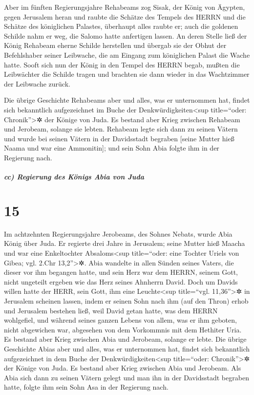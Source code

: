 Aber im fünften Regierungsjahre Rehabeams zog Sisak, der
König von Ägypten, gegen Jerusalem heran und raubte die
Schätze des Tempels des HERRN und die Schätze des königlichen Palastes,
überhaupt alles raubte er; auch die goldenen Schilde nahm er weg, die
Salomo hatte anfertigen lassen. An deren Stelle ließ der
König Rehabeam eherne Schilde herstellen und übergab sie der Obhut der
Befehlshaber seiner Leibwache, die am Eingang zum königlichen Palast die
Wache hatte. Sooft sich nun der König in den Tempel des
HERRN begab, mußten die Leibwächter die Schilde tragen und brachten sie
dann wieder in das Wachtzimmer der Leibwache zurück.

Die übrige Geschichte Rehabeams aber und alles, was er
unternommen hat, findet sich bekanntlich aufgezeichnet im Buche der
Denkwürdigkeiten\textless sup title=``oder: Chronik''\textgreater✲ der
Könige von Juda. Es bestand aber Krieg zwischen Rehabeam
und Jerobeam, solange sie lebten. Rehabeam legte sich
dann zu seinen Vätern und wurde bei seinen Vätern in der Davidsstadt
begraben {[}seine Mutter hieß Naama und war eine Ammonitin{]}; und sein
Sohn Abia folgte ihm in der Regierung nach.

\hypertarget{cc-regierung-des-kuxf6nigs-abia-von-juda}{%
\subparagraph{cc) Regierung des Königs Abia von
Juda}\label{cc-regierung-des-kuxf6nigs-abia-von-juda}}

\hypertarget{section-14}{%
\section{15}\label{section-14}}

Im achtzehnten Regierungsjahre Jerobeams, des Sohnes
Nebats, wurde Abia König über Juda. Er regierte drei Jahre
in Jerusalem; seine Mutter hieß Maacha und war eine Enkeltochter
Absaloms\textless sup title=``oder: eine Tochter Uriels von Gibea; vgl.
2.Chr 13,2''\textgreater✲. Abia wandelte in allen Sünden
seines Vaters, die dieser vor ihm begangen hatte, und sein Herz war dem
HERRN, seinem Gott, nicht ungeteilt ergeben wie das Herz seines Ahnherrn
David. Doch um Davids willen hatte der HERR, sein Gott,
ihm eine Leuchte\textless sup title=``vgl. 11,36''\textgreater✲ in
Jerusalem scheinen lassen, indem er seinen Sohn nach ihm (auf den Thron)
erhob und Jerusalem bestehen ließ, weil David getan hatte,
was dem HERRN wohlgefiel, und während seines ganzen Lebens von allem,
was er ihm geboten, nicht abgewichen war, abgesehen von dem Vorkommnis
mit dem Hethiter Uria. Es bestand aber Krieg zwischen Abia
und Jerobeam, solange er lebte. Die übrige Geschichte
Abias aber und alles, was er unternommen hat, findet sich bekanntlich
aufgezeichnet in dem Buche der Denkwürdigkeiten\textless sup
title=``oder: Chronik''\textgreater✲ der Könige von Juda. Es bestand
aber Krieg zwischen Abia und Jerobeam. Als Abia sich dann
zu seinen Vätern gelegt und man ihn in der Davidsstadt begraben hatte,
folgte ihm sein Sohn Asa in der Regierung nach.

